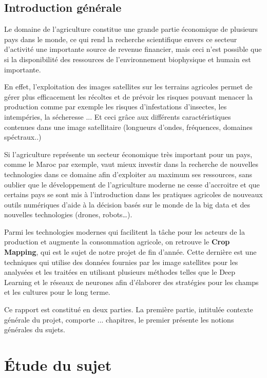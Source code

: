 \documentclass[12pt, openany]{report}
\begin{document}
\newpage
\strut 


\listoffigures
\tableofcontents
\chapter*{Introduction générale}

Le domaine de l’agriculture constitue une grande partie économique de plusieurs pays dans le monde, ce qui rend la recherche scientifique envers ce secteur d’activité une importante source de revenue financier, mais ceci n’est possible que si la disponibilité des ressources de l’environnement biophysique et humain est importante.
\par
En effet, l’exploitation des images satellites sur les terrains agricoles permet de gérer plus efficacement les récoltes et de prévoir les risques pouvant menacer la production comme par exemple les risques d’infestations d’insectes, les intempéries, la sécheresse ... Et ceci grâce aux différents caractéristiques contenues dans une image satellitaire (longueurs d’ondes, fréquences, domaines spéctraux..)
\par
Si l’agriculture représente un secteur économique très important pour un pays, comme le Maroc par exemple, vaut mieux investir dans la recherche de nouvelles technologies dans ce domaine afin d’exploiter au maximum ses ressources, sans oublier que le développement de l’agriculture moderne ne cesse d’accroitre et que certains pays se sont mis à l’introduction dans les pratiques agricoles de nouveaux outils numériques d’aide à la décision basés sur le monde de la big data et des nouvelles technologies (drones, robots…).
\par
Parmi les technologies modernes qui facilitent la tâche pour les acteurs de la production et augmente la consommation	 agricole, on retrouve le \textbf{Crop Mapping}, qui est le sujet de notre projet de fin d’année.  Cette dernière est une techniques qui utilise des données fournies par les image satellites pour les analysées et les traitées en utilisant plusieurs méthodes telles que le Deep Learning et le réseaux de neurones afin d’élaborer des stratégies pour les champs et les cultures pour le long terme.
\par
Ce rapport est constitué en deux parties. La première partie, intitulée contexte générale du projet, comporte ... chapitres, le premier présente les notions générales du sujets.


\part{Étude du sujet}
\end{document}
